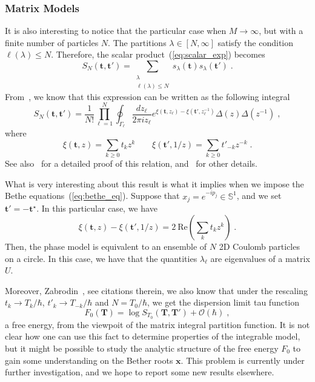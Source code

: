 \documentclass[a4paper,11pt]{amsart}
\begin{document}
\subsubsection{Matrix Models}

It is also interesting to notice that the particular case when \(M\to
\infty\), but with a finite number of particles \(N\). The
partitions \(\lambda \in [N, \infty]\) satisfy the condition
\(\ell(\lambda) \leq N\). Therefore, the scalar
product~(\ref{eq:scalar_exp}) becomes
\begin{equation}
  S_N(\bm{t}, \bm{t}') = \sum_{\substack{\lambda \\ \ell(\lambda) \leq N}}
  s_\lambda(\bm{t})  s_\lambda(\bm{t}') \; .
\end{equation}
From~\cite{Zabrodin:2010ii}, we know that this expression can be
written as the following integral
\begin{equation}
  S_N(\bm{t}, \bm{t}') =
  \frac{1}{N!} \prod_{\ell=1}^N \oint_{\Gamma_\ell} \frac{dz_\ell}{2 \pi i z_\ell}
  e^{\xi(\bm{t}, z_\ell) - \xi(\bm{t}', z_{\ell}^{-1})} \Delta(z)\Delta(z^{-1})\; ,
\end{equation}
where
\begin{equation}
\xi(\bm{t}, z) = \sum_{k\geq 0} t_k z^k \qquad
\xi(\bm{t}', 1/z) = \sum_{k\geq 0} t'_{-k} z^{-k} \; . 
\end{equation}
See also~\cite{Kharchev:1991gd} for a detailed proof of this relation,
and~\cite{Orlov:2005} for other details. 

What is very interesting about this result is what it implies when we 
impose the Bethe equations~(\ref{eq:bethe_eq}). Suppose that 
\(x_j = e^{-ip_j} \in \mathbb{S}^1\), and we set \(\bm{t}' = - \bm{t}^\star\).
In this particular case, we have
\begin{equation}
\xi(\bm{t}, z) - \xi(\bm{t}', 1/z)  = 2 \ \textrm{Re}\left(\sum_k t_k z^k\right)\; .
\end{equation}
Then, the phase model is equivalent to an ensemble of \(N\) 2D Coulomb
particles on a circle. In this case, we have that the quantities
\(\lambda_{\ell}\) are eigenvalues of a matrix \(U\).

Moreover, Zabrodin~\cite{Zabrodin:2010ii}, see citations therein, we also know
that under the rescaling \(t_k \to T_k/ \hbar\), \(t'_k \to T_{-k}/ \hbar\)
and \(N = T_0/ \hbar\), we get the dispersion limit tau function 
\begin{equation}
  F_0(\bm{T}) = \log S_{T_0}(\bm{T}, \bm{T}') + \mathcal{O}(\hbar)\; ,
\end{equation}
a free energy, from the viewpoit of the matrix integral partition
function.  It is not clear how one can use this fact to determine
properties of the integrable model, but it might be possible to study
the analytic structure of the free energy \(F_0\) to gain some
understanding on the Bether roots \(\bm{x}\).  This problem is
currently under further investigation, and we hope to report some new
results elsewhere.
\end{document}
